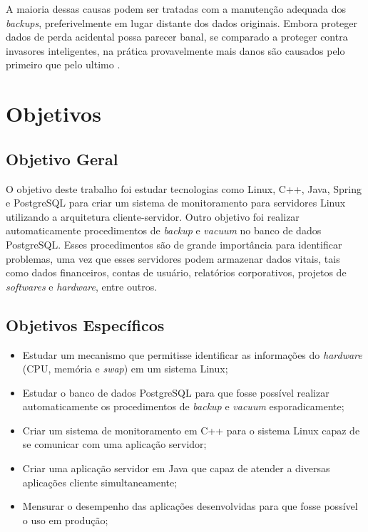 A maioria dessas causas podem ser tratadas com a manutenção adequada dos \textit{backups}, preferivelmente em lugar distante dos dados originais. Embora proteger dados de perda acidental possa parecer banal, se comparado a proteger contra invasores inteligentes, na prática provavelmente mais danos são causados pelo primeiro que pelo ultimo \cite{Tanenbaum:2003, Silberschatz:2000}.


\section{Objetivos} \label{Sec:Objetivos}

\subsection{Objetivo Geral} \label{Sec:ObjetivoGeral}

O objetivo deste trabalho foi estudar tecnologias como Linux, C++, Java, Spring e PostgreSQL para criar um sistema de monitoramento para servidores Linux utilizando a arquitetura cliente-servidor. Outro objetivo foi realizar automaticamente procedimentos de \textit{backup} e \textit{vacuum} no banco de dados PostgreSQL. Esses procedimentos são de grande importância para identificar problemas, uma vez que esses servidores podem armazenar dados vitais, tais como dados financeiros, contas de usuário, relatórios corporativos, projetos de \textit{softwares} e \textit{hardware}, entre outros.


\subsection{Objetivos Específicos}\label{Sec:ObjetivosEspecificos}
\begin{itemize}
    \item Estudar um mecanismo que permitisse identificar as informações do \textit{hardware} (CPU, memória e \textit{swap}) em um sistema Linux;
    
    \item Estudar o banco de dados PostgreSQL para que fosse possível realizar automaticamente os procedimentos de \textit{backup} e \textit{vacuum} esporadicamente;

	\item Criar um sistema de monitoramento em C++ para o sistema Linux capaz de se comunicar com uma aplicação servidor;
	
	\item Criar uma aplicação servidor em Java que capaz de atender a diversas aplicações cliente simultaneamente;
	
	\item Mensurar o desempenho das aplicações desenvolvidas para que fosse possível o uso em produção;

\end{itemize}


